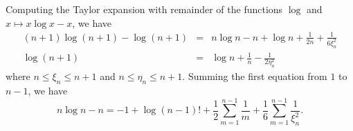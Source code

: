 \documentclass[12pt]{article}
\begin{document}
Computing the Taylor expansion with remainder of the 
functions $\log$ and $x \mapsto x \log x - x$, we have
\begin{align*}
(n + 1) \log (n + 1) - \log (n + 1) &=& n \log n - n + \log n +
  \frac{1}{2n} + \frac{1}{6\xi_n^2} \\
\log (n + 1) &=& \log n + \frac {1}{n} - \frac{1}{2 \eta_n^2}
\end{align*}
where $n \le \xi_n \le n + 1$ and $n \le \eta_n \le n + 1$.
Summing the first equation from $1$ to $n - 1$, we have
\[
n \log n - n = -1 + \log (n-1)! + \frac{1}{2} \sum_{m=1}^{n-1} 
 \frac{1}{m} + \frac{1}{6} \sum_{m=1}^{n-1} \frac{1}{\xi_n^2}.
\]
\end{document}

